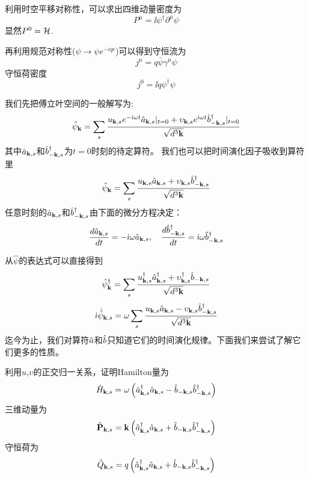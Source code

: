 \documentclass[CJK]{beamer}
\begin{document}
\begin{frame}
\bch
利用时空平移对称性，可以求出四维动量密度为
$$P^\mu = \ii\psi^\dagger \partial^\mu \psi$$
显然$P^0 = {\mathcal{H}}$.

再利用规范对称性($\psi \rightarrow \psi e^{-iq\epsilon}$)可以得到守恒流为
$$j^\mu = q \bar\psi \gamma^\mu \psi$$
守恒荷密度
$$j^0 = \ii q\psi^\dagger\psi$$
\ech
\end{frame}


\begin{frame}
\bch
我们先把傅立叶空间的一般解写为:
$$\hat\psi_{{\mathbf{k}}} = \sum_{s}\frac{u_{{\mathbf{k}},s}e^{-{\dot{\imath}} \omega t} {\hat{a}}_{{\mathbf{k}},s}|_{t=0} + \upsilon_{{\mathbf{k}},s}e^{{\dot{\imath}} \omega t} {\hat{b}^\dagger}_{-{\mathbf{k}},s}|_{t=0}}{\sqrt{d^3{\mathbf{k}}}}$$
其中${\hat{a}}_{{\mathbf{k}},s}$和${\hat{b}^\dagger}_{-{\mathbf{k}},s}$为$t=0$时刻的待定算符。
我们也可以把时间演化因子吸收到算符里
$$\hat\psi_{{\mathbf{k}}} = \sum_{s}\frac{u_{{\mathbf{k}},s} {\hat{a}}_{{\mathbf{k}},s} + \upsilon_{{\mathbf{k}},s} {\hat{b}^\dagger}_{-{\mathbf{k}},s}}{\sqrt{d^3{\mathbf{k}}}}$$
任意时刻的${\hat{a}}_{{\mathbf{k}},s}$和${\hat{b}^\dagger}_{-{\mathbf{k}},s}$由下面的微分方程决定：
$$\frac{d{\hat{a}}_{{\mathbf{k}},s}}{dt} = - {\dot{\imath}}\omega {\hat{a}}_{{\mathbf{k}},s},\ \ \ \frac{d{\hat{b}^\dagger}_{-{\mathbf{k}},s}}{dt} = {\dot{\imath}}\omega {\hat{b}^\dagger}_{-{\mathbf{k}},s}$$
\ech
\end{frame}

\begin{frame}
\bch
从$\hat\psi$的表达式可以直接得到
$$\hat\psi^\dagger_{{\mathbf{k}}} = \sum_{s}\frac{u^\dagger_{{\mathbf{k}},s} {\hat{a}^\dagger}_{{\mathbf{k}},s} + \upsilon^\dagger_{{\mathbf{k}},s} {\hat{b}}_{-{\mathbf{k}},s}}{\sqrt{d^3{\mathbf{k}}}}$$
$${\dot{\imath}} \dot{\hat\psi}_{{\mathbf{k}},s} = \omega  \sum_{s}  \frac{u_{{\mathbf{k}},s}{\hat{a}}_{{\mathbf{k}},s} - \upsilon_{{\mathbf{k}},s}{\hat{b}^\dagger}_{-{\mathbf{k}},s}}{\sqrt{d^3{\mathbf{k}}}} $$
迄今为止，我们对算符${\hat{a}}$和${\hat{b}}$只知道它们的时间演化规律。下面我们来尝试了解它们更多的性质。
\ech
\end{frame}

\begin{frame}
\bch
利用$u$,$\upsilon$的正交归一关系，证明Hamilton量为
$$\hat{H}_{{\mathbf{k}},s} =  \omega\left({\hat{a}^\dagger}_{{\mathbf{k}},s}{\hat{a}}_{{\mathbf{k}},s} - {\hat{b}}_{-{\mathbf{k}},s}{\hat{b}^\dagger}_{-{\mathbf{k}},s} \right)$$
三维动量为
$$\hat{\mathbf{P}}_{{\mathbf{k}},s} =  {\mathbf{k}}\left({\hat{a}^\dagger}_{{\mathbf{k}},s}{\hat{a}}_{{\mathbf{k}},s} + {\hat{b}}_{-{\mathbf{k}},s}{\hat{b}^\dagger}_{-{\mathbf{k}},s} \right)$$
守恒荷为
$$\hat{Q}_{{\mathbf{k}},s} =  q\left({\hat{a}^\dagger}_{{\mathbf{k}},s}{\hat{a}}_{{\mathbf{k}},s} + {\hat{b}}_{-{\mathbf{k}},s}{\hat{b}^\dagger}_{-{\mathbf{k}},s} \right)$$
\ech
\end{frame}
\end{document}
